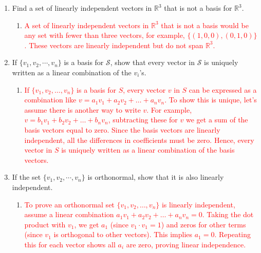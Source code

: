 \documentclass[11pt]{article}
\begin{document}
\begin{enumerate}
\begin{enumerate}
\item Find a set of linearly independent vectors in $\mathbb{R}^3$ that is not a basis for $\mathbb{R}^3$.
\\[-.25cm]

\begin{enumerate}
    \item[\textcolor{red}{}] \textcolor{red}{A set of linearly independent vectors in $\mathbb{R}^3$ that is not a basis would be any set with fewer than three vectors, for example, $\{(1, 0, 0), (0, 1, 0)\}$. These vectors are linearly independent but do not span $\mathbb{R}^3$.}
\end{enumerate}

\item If $\{ v_1, v_2, \cdots , v_n\}$ is a basis for $\mathcal{S}$, show that every vector 
in $\mathcal{S}$ is uniquely written as a linear combination of the $v_i$'s.
\\[-.25cm]

\begin{enumerate}
        \item[\textcolor{red}{}] \textcolor{red}{
        If $\{v_1, v_2, \ldots, v_n\}$ is a basis for $S$, every vector $v$ in $S$ can be expressed as a combination like $v = a_1v_1 + a_2v_2 + \ldots + a_nv_n$. To show this is unique, let's assume there is another way to write $v$. For example, $v = b_1v_1 + b_2v_2 + \ldots + b_nv_n$, subtracting these for $v$ we get a sum of the basis vectors equal to zero. Since the basis vectors are linearly independent, all the differences in coefficients must be zero.  Hence, every vector in $S$ is uniquely written as a linear combination of the basis vectors.
    }
\end{enumerate}

\item If the set $\{ v_1, v_2, \cdots , v_n\}$ is orthonormal, show that it is also linearly independent.
\begin{enumerate}
        \item[\textcolor{red}{}] \textcolor{red}{
        To prove an orthonormal set $\{v_1, v_2, \ldots, v_n\}$ is linearly independent, assume a linear combination $a_1v_1 + a_2v_2 + \ldots + a_nv_n = 0$. Taking the dot product with $v_1$, we get $a_1$ (since $v_1 \cdot v_1 = 1$) and zeros for other terms (since $v_1$ is orthogonal to other vectors). This implies $a_1 = 0$. Repeating this for each vector shows all $a_i$ are zero, proving linear independence.
    }
\end{enumerate}


\end{enumerate}
\end{enumerate}
\end{document}
